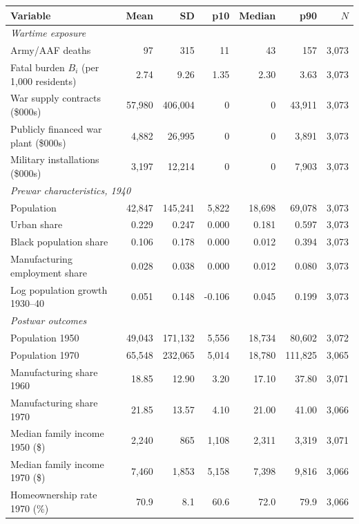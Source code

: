 \begin{tabular}{lrrrrrr}
\toprule
Variable & Mean & SD & p10 & Median & p90 & $N$ \\
\midrule
\multicolumn{7}{l}{\emph{Wartime exposure}} \\
\quad Army/AAF deaths & 97 & 315 & 11 & 43 & 157 & 3,073 \\
\quad Fatal burden $B_i$ (per 1{,}000 residents) & 2.74 & 9.26 & 1.35 & 2.30 & 3.63 & 3,073 \\
\quad War supply contracts (\$000s) & 57,980 & 406,004 & 0 & 0 & 43,911 & 3,073 \\
\quad Publicly financed war plant (\$000s) & 4,882 & 26,995 & 0 & 0 & 3,891 & 3,073 \\
\quad Military installations (\$000s) & 3,197 & 12,214 & 0 & 0 & 7,903 & 3,073 \\
\multicolumn{7}{l}{\emph{Prewar characteristics, 1940}} \\
\quad Population & 42,847 & 145,241 & 5,822 & 18,698 & 69,078 & 3,073 \\
\quad Urban share & 0.229 & 0.247 & 0.000 & 0.181 & 0.597 & 3,073 \\
\quad Black population share & 0.106 & 0.178 & 0.000 & 0.012 & 0.394 & 3,073 \\
\quad Manufacturing employment share & 0.028 & 0.038 & 0.000 & 0.012 & 0.080 & 3,073 \\
\quad Log population growth 1930--40 & 0.051 & 0.148 & -0.106 & 0.045 & 0.199 & 3,073 \\
\multicolumn{7}{l}{\emph{Postwar outcomes}} \\
\quad Population 1950 & 49,043 & 171,132 & 5,556 & 18,734 & 80,602 & 3,072 \\
\quad Population 1970 & 65,548 & 232,065 & 5,014 & 18,780 & 111,825 & 3,065 \\
\quad Manufacturing share 1960 & 18.85 & 12.90 & 3.20 & 17.10 & 37.80 & 3,071 \\
\quad Manufacturing share 1970 & 21.85 & 13.57 & 4.10 & 21.00 & 41.00 & 3,066 \\
\quad Median family income 1950 (\$) & 2,240 & 865 & 1,108 & 2,311 & 3,319 & 3,071 \\
\quad Median family income 1970 (\$) & 7,460 & 1,853 & 5,158 & 7,398 & 9,816 & 3,066 \\
\quad Homeownership rate 1970 (\%) & 70.9 & 8.1 & 60.6 & 72.0 & 79.9 & 3,066 \\
\bottomrule
\end{tabular}
